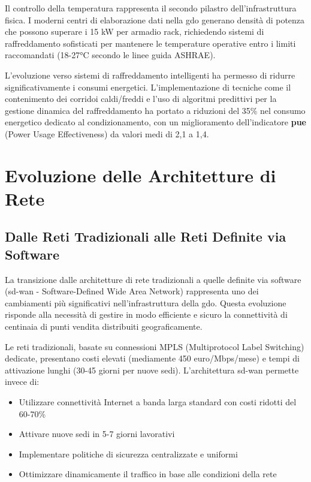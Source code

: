 Il controllo della temperatura rappresenta il secondo pilastro dell'infrastruttura fisica. I moderni centri di elaborazione dati nella \gls{gdo} generano densità di potenza che possono superare i 15 kW per armadio rack, richiedendo sistemi di raffreddamento sofisticati per mantenere le temperature operative entro i limiti raccomandati (18-27°C secondo le linee guida ASHRAE\autocite{ASHRAE2023}).

L'evoluzione verso sistemi di raffreddamento intelligenti ha permesso di ridurre significativamente i consumi energetici. L'implementazione di tecniche come il contenimento dei corridoi caldi/freddi e l'uso di algoritmi predittivi per la gestione dinamica del raffreddamento ha portato a riduzioni del 35\% nel consumo energetico dedicato al condizionamento, con un miglioramento dell'indicatore \textbf{\gls{pue}} (Power Usage Effectiveness) da valori medi di 2,1 a 1,4.

\section{\texorpdfstring{Evoluzione delle Architetture di Rete}{3.4 - Evoluzione delle Architetture di Rete}}
\label{sec:architetture_rete}

\subsection{\texorpdfstring{Dalle Reti Tradizionali alle Reti Definite via Software}{3.4.1 - Dalle Reti Tradizionali alle Reti Definite via Software}}
\label{subsec:sdn}

La transizione dalle architetture di rete tradizionali a quelle definite via software (\gls{sd-wan} - Software-Defined Wide Area Network) rappresenta uno dei cambiamenti più significativi nell'infrastruttura della \gls{gdo}. Questa evoluzione risponde alla necessità di gestire in modo efficiente e sicuro la connettività di centinaia di punti vendita distribuiti geograficamente\autocite{cisco2024}.

Le reti tradizionali, basate su connessioni MPLS (Multiprotocol Label Switching) dedicate, presentano costi elevati (mediamente 450 euro/Mbps/mese) e tempi di attivazione lunghi (30-45 giorni per nuove sedi). L'architettura \gls{sd-wan} permette invece di:

\begin{itemize}
    \item Utilizzare connettività Internet a banda larga standard con costi ridotti del 60-70\%
    \item Attivare nuove sedi in 5-7 giorni lavorativi
    \item Implementare politiche di sicurezza centralizzate e uniformi
    \item Ottimizzare dinamicamente il traffico in base alle condizioni della rete
\end{itemize}

